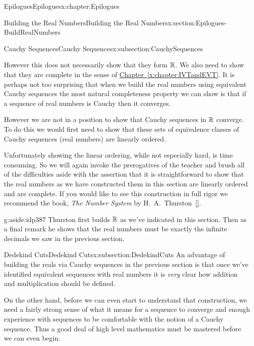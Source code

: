 \begin{chapterptx}{Epilogues}{}{Epilogues}{}{}{x:chapter:Epilogues}
\begin{sectionptx}{Building the Real Numbers}{}{Building the Real Numbers}{}{}{x:section:Epilogues-BuildRealNumbers}
\begin{subsectionptx}{Cauchy Sequences}{}{Cauchy Sequences}{}{}{x:subsection:CauchySequences}
			\par
			However this does not necessarily show that they form \(\mathbb {R}\).  We also need to show that they are complete in the sense of \hyperref[x:chapter:IVTandEVT]{Chapter~{\xreffont\ref{x:chapter:IVTandEVT}}}.  It is perhaps not too surprising that when we build the real numbers using equivalent Cauchy sequences the most natural completeness property we can show is that if a sequence of real numbers is Cauchy then it converges.%
			\par
			However we are not in a position to show that Cauchy sequences in \(\mathbb {R}\) converge.  To do this we would first need to show that these sets of equivalence classes of Cauchy sequences (real numbers) are linearly ordered.%
			\par
			Unfortunately showing the linear ordering, while not especially hard, is time consuming. So we will again invoke the prerogatives of the teacher and brush all of the difficulties aside with the assertion that it is straightforward to show that the real numbers as we have constructed them in this section are linearly ordered and are complete. If you would like to see this construction in full rigor we recommend the book, \emph{The Number System} by H.~A.~Thurston~\hyperlink{x:biblio:thurston56__number_system}{[{}]}.%
			\begin{aside}{}{g:aside:idp387}%
				Thurston first builds \(\mathbb {R}\) as we've indicated in this section. Then as a final remark he shows that the real numbers must be exactly the infinite decimals we saw in the previous section.%
			\end{aside}
		\end{subsectionptx}
		\typeout{************************************************}
		\typeout{************************************************}
		\begin{subsectionptx}{Dedekind Cuts}{}{Dedekind Cuts}{}{}{x:subsection:DedekindCuts}
			An advantage of building the reals via Cauchy sequences in the previous section is that once we've identified equivalent sequences with real numbers it is \emph{very} clear how addition and multiplication should be defined.%
			\par
			On the other hand, before we can even start to understand that construction, we need a fairly strong sense of what it means for a sequence to converge and enough experience with sequences to be comfortable with the notion of a Cauchy sequence. Thus a good deal of high level mathematics must be mastered before we can even begin.%

\end{subsectionptx}
\end{sectionptx}
\end{chapterptx}
